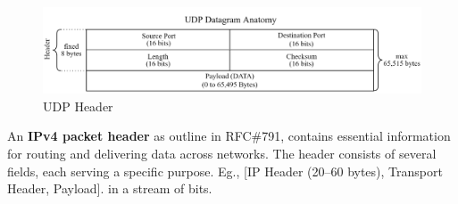 \begin{figure}[h!]
    \hspace{-2em}
    \includegraphics[width=1.1\textwidth]{Sections/network/udp.png}
    \caption{UDP Header}
    \label{fig:udp_header}
\end{figure}

\newpage
\begin{Def}

    An \textbf{IPv4 packet header} as outline in RFC\#791, contains essential information for routing and delivering data across networks. 
    The header consists of several fields, each serving a specific purpose. 
    Eg., [IP Header (20–60 bytes), Transport Header, Payload]. in a stream of bits. \hfill \cite{rfc791}
\end{Def}
